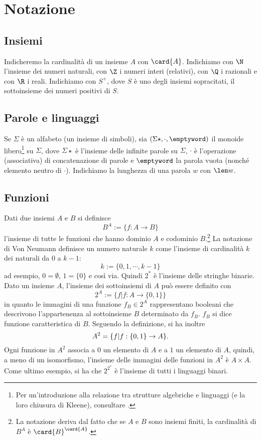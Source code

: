 \section*{Notazione}


\subsection*{Insiemi}
Indicheremo la cardinalità di un insieme $A$ con $\card{A}$.
Indichiamo con $\N$ l'insieme dei numeri naturali, con $\Z$ i numeri interi (relativi), con $\Q$ i razionali e con $\R$ i reali.
Indichiamo con $S^+$, dove $S$ è uno degli insiemi sopracitati, il sottoinsieme dei numeri positivi di $S$.


\subsection*{Parole e linguaggi}
Se $\Sigma$ è un alfabeto (un insieme di simboli), sia $(\Sigma\star, \cdot, \emptyword)$ il monoide libero\footnote{Per un'introduzione alla relazione tra strutture algebriche e linguaggi (e la loro	chiusura di Kleene), consultare \cite{Sakarovitch:09:automata}.} su $\Sigma$, dove $\Sigma\star$ è l'insieme delle infinite parole su $\Sigma$, $\cdot$ è l'operazione (associativa) di concatenazione di parole e $\emptyword$ la parola vuota (nonché elemento neutro di $\cdot$).
Indichiamo la lunghezza di una parola $w$ con $\len w$.


\subsection*{Funzioni}
Dati due insiemi $A$ e $B$ si definisce
\begin{equation*}
	B^A := \{f : A \to B\}
\end{equation*}
l'insieme di tutte le funzioni che hanno dominio $A$ e codominio $B$.\footnote{La notazione deriva dal fatto che se $A$ e $B$ sono insiemi finiti, la cardinalità di $B^A$ è $\card{B}^{\card{A}}$.}
La notazione di Von Neumann definisce un numero naturale $k$ come l'insieme di cardinalità $k$ dei naturali da $0$ a $k-1$:
$$
	k := \{0,1,\cdots,k-1\}
$$
ad esempio, $0 = \emptyset$, $1 = \{0\}$ e così via. Quindi $2^*$ è l'insieme delle stringhe binarie.
Dato un insieme $A$, l'insieme dei sottoinsiemi di $A$ può essere definito con
$$
	2^A := \{f | f: A \to \{0,1\}\}
$$
in quanto le immagini di una funzione $f_B\in2^A$ rappresentano booleani che descrivono l'appartenenza al sottoinsieme $B$ determinato da $f_B$. $f_B$ si dice funzione caratteristica di $B$.
Seguendo la definizione, si ha inoltre
$$
	A^2 = \{f| f: \{0,1\} \to A\}\text.
$$
Ogni funzione in $A^2$ associa a $0$ un elemento di $A$ e a $1$ un elemento di $A$, quindi, a meno di un isomorfismo, l'insieme delle immagini delle funzioni in $A^2$ è $A \times A$.
Come ultimo esempio, si ha che $2^{2^*}$ è l'insieme di tutti i linguaggi binari.


